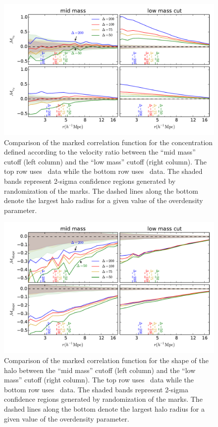 \documentclass[usenatbib,usegraphicx,letterpaper]{mn2e}
\begin{document}
\begin{figure}
	\centering
	\includegraphics[width=.9\textwidth]{all_mcf_cV_z00_hostsvlow.pdf}
	\caption{Comparison of the marked correlation function for the concentration defined according to the velocity ratio between the ``mid mass'' cutoff (left column) and the ``low mass'' cutoff (right column). The top row uses \simA \ data while the bottom row uses \simB \ data. The shaded bands represent 2-sigma confidence regions generated by randomization of the marks. The dashed lines along the bottom denote the largest halo radius for a given value of the overdensity parameter.}
	\label{fig:hvl_mcf_cV}
\end{figure}

\begin{figure}
	\centering
	\includegraphics[width=.9\textwidth]{all_mcf_s_z00_hostsvlow.pdf}
	\caption{Comparison of the marked correlation function for the shape of the halo between the ``mid mass'' cutoff (left column) and the ``low mass'' cutoff (right column). The top row uses \simA \ data while the bottom row uses \simB \ data. The shaded bands represent 2-sigma confidence regions generated by randomization of the marks. The dashed lines along the bottom denote the largest halo radius for a given value of the overdensity parameter.}
	\label{fig:hvl_mcf_s}
\end{figure}
\end{document}

